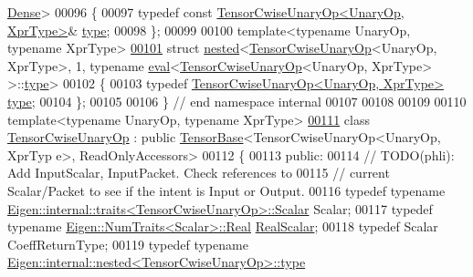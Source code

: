 \begin{DoxyCode}
      \hyperlink{struct_eigen_1_1_dense}{Dense}>
00096 \{
00097   \textcolor{keyword}{typedef} \textcolor{keyword}{const} \hyperlink{class_eigen_1_1_tensor_cwise_unary_op}{TensorCwiseUnaryOp<UnaryOp, XprType>}& 
      \hyperlink{class_eigen_1_1_tensor_cwise_unary_op}{type};
00098 \};
00099 
00100 \textcolor{keyword}{template}<\textcolor{keyword}{typename} UnaryOp, \textcolor{keyword}{typename} XprType>
\hyperlink{struct_eigen_1_1internal_1_1nested_3_01_tensor_cwise_unary_op_3_01_unary_op_00_01_xpr_type_01_4_1f8fce5c50cd854f51c6d2039d1e9327}{00101} \textcolor{keyword}{struct }\hyperlink{struct_eigen_1_1internal_1_1nested}{nested}<\hyperlink{class_eigen_1_1_tensor_cwise_unary_op}{TensorCwiseUnaryOp}<UnaryOp, XprType>, 1, typename 
      \hyperlink{struct_eigen_1_1internal_1_1eval}{eval}<\hyperlink{class_eigen_1_1_tensor_cwise_unary_op}{TensorCwiseUnaryOp}<UnaryOp, XprType> >::\hyperlink{class_eigen_1_1_tensor_cwise_unary_op}{type}>
00102 \{
00103   \textcolor{keyword}{typedef} \hyperlink{class_eigen_1_1_tensor_cwise_unary_op}{TensorCwiseUnaryOp<UnaryOp, XprType>} 
      \hyperlink{class_eigen_1_1_tensor_cwise_unary_op}{type};
00104 \};
00105 
00106 \}  \textcolor{comment}{// end namespace internal}
00107 
00108 
00109 
00110 \textcolor{keyword}{template}<\textcolor{keyword}{typename} UnaryOp, \textcolor{keyword}{typename} XprType>
\hyperlink{class_eigen_1_1_tensor_cwise_unary_op}{00111} \textcolor{keyword}{class }\hyperlink{class_eigen_1_1_tensor_cwise_unary_op}{TensorCwiseUnaryOp} : \textcolor{keyword}{public} \hyperlink{class_eigen_1_1_tensor_base}{TensorBase}<TensorCwiseUnaryOp<UnaryOp, XprTyp
      e>, ReadOnlyAccessors>
00112 \{
00113   \textcolor{keyword}{public}:
00114     \textcolor{comment}{// TODO(phli): Add InputScalar, InputPacket.  Check references to}
00115     \textcolor{comment}{// current Scalar/Packet to see if the intent is Input or Output.}
00116     \textcolor{keyword}{typedef} \textcolor{keyword}{typename} \hyperlink{struct_eigen_1_1internal_1_1traits}{Eigen::internal::traits<TensorCwiseUnaryOp>::Scalar}
       Scalar;
00117     \textcolor{keyword}{typedef} \textcolor{keyword}{typename} \hyperlink{group___sparse_core___module}{Eigen::NumTraits<Scalar>::Real} 
      \hyperlink{group___sparse_core___module}{RealScalar};
00118     \textcolor{keyword}{typedef} Scalar CoeffReturnType;
00119     \textcolor{keyword}{typedef} \textcolor{keyword}{typename} \hyperlink{class_eigen_1_1internal_1_1_tensor_lazy_evaluator_writable}{Eigen::internal::nested<TensorCwiseUnaryOp>::type}

\end{DoxyCode}
